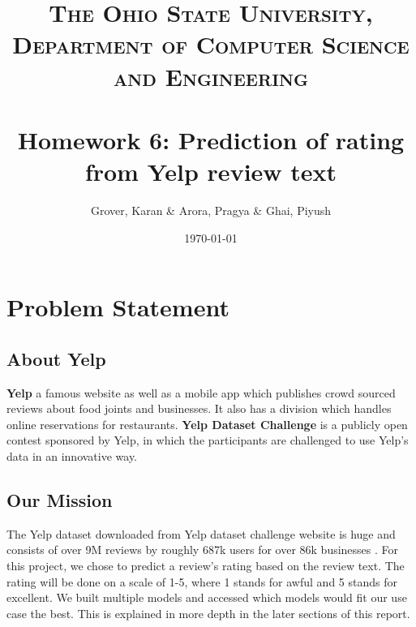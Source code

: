 \documentclass[paper=a4, fontsize=11pt]{scrartcl} %
\title{	
\normalfont \normalsize 
\textsc{The Ohio State University, Department of Computer Science and Engineering} \\ [25pt] %
\horrule{0.5pt} \\[0.4cm] %
\huge Homework 6: Prediction of rating from Yelp review text %
\horrule{2pt} \\[0.5cm] %
}
\author{Grover, Karan \& Arora, Pragya \& Ghai, Piyush}
\affil{\textit {\{grover.120, arora.170, ghai.8\}@osu.edu}}
\date{\normalsize\today} %
\numberwithin{equation}{section} %
\numberwithin{figure}{section} %
\numberwithin{table}{section} %
\begin{document}
\maketitle %
\newpage
\section{Problem Statement}
\subsection{About Yelp}
\textbf{Yelp} \cite{yelp} a famous website as well as a mobile app which publishes crowd sourced reviews about food joints and businesses. It also has a division which handles online reservations for restaurants. \textbf{Yelp Dataset Challenge}\cite{yelp_dataset_challenge} is a publicly open contest sponsored by Yelp, in which the participants are challenged to use Yelp's data in an innovative way. \\
\subsection{Our Mission}
The Yelp dataset downloaded from Yelp dataset challenge website is huge and consists of over 9M reviews by roughly 687k users for over 86k businesses \cite{yelp_dataset_challenge}. For this project, we chose to predict a review's rating based on the review text. The rating will be done on a scale of 1-5, where 1 stands for awful and 5 stands for excellent. We built multiple models and accessed which models would fit our use case the best. This is explained in more depth in the later sections of this report.
\end{document}
